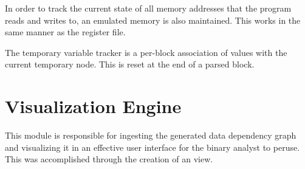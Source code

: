 In order to track the current state of all memory addresses that the program reads and writes to, an emulated memory is also maintained. This works in the same manner as the register file. 

The temporary variable tracker is a per-block association of values with the current temporary node. This is reset at the end of a parsed block.

\section{Visualization Engine}
This module is responsible for ingesting the generated data dependency graph and visualizing it in an effective user interface for the binary analyst to peruse. This was accomplished through the creation of an  view.